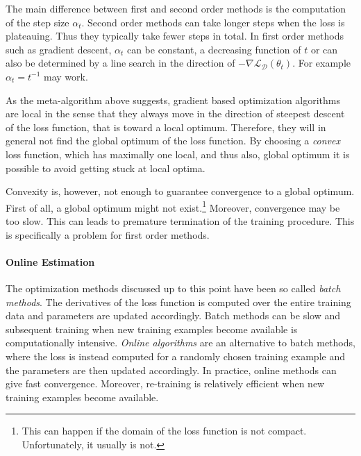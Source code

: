 The main difference between first and second order methods is the
computation of the step size $\alpha_t$. Second order methods can take
longer steps when the loss is plateauing. Thus they typically take
fewer steps in total. In first order methods such as gradient descent,
$\alpha_t$ can be constant, a decreasing function of $t$ or can also
be determined by a line search in the direction of $-\nabla
\mathcal{L}_{\mathcal{D}}(\theta_t)$. For example $\alpha_t =
t^{-1}$ may work.%


As the meta-algorithm above suggests, gradient based optimization
algorithms are local in the sense that they always move in the
direction of steepest descent of the loss function, that is toward a
local optimum. Therefore, they will in general not find the global
optimum of the loss function. By choosing a {\it convex} loss
function, which has maximally one local, and thus also, global optimum it
is possible to avoid getting stuck at local optima.

Convexity is, however, not enough to guarantee convergence to a global
optimum. First of all, a global optimum might not exist.\footnote{This
can happen if the domain of the loss function is not
compact. Unfortunately, it usually is not.} Moreover, convergence may be
too slow. This can leads to premature termination of the training
procedure. This is specifically a problem for first order methods.

\paragraph{Online Estimation} The optimization methods
discussed up to this point have been so called {\it batch
  methods}. The derivatives of the loss function is computed over the
entire training data and parameters are updated accordingly. Batch
methods can be slow and subsequent training when new training examples
become available is computationally intensive. {\it Online algorithms}
are an alternative to batch methods, where the loss is instead
computed for a randomly chosen training example and the parameters are
then updated accordingly. In practice, online methods
can give fast convergence. Moreover, re-training is relatively
efficient when new training examples become available.

